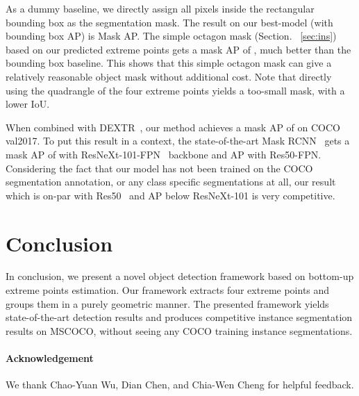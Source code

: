 \documentclass[10pt,twocolumn,letterpaper]{article}
\begin{document}
As a dummy baseline, we directly assign all pixels inside the rectangular bounding box as the segmentation mask. 
The result on our best-model (with  bounding box AP) is  Mask AP.
The simple octagon mask (Section. ~\ref{sec:ins}) based on our predicted extreme points gets a mask AP of , much better than the bounding box baseline.
This shows that this simple octagon mask can give a relatively reasonable object mask without additional cost.
Note that directly using the quadrangle of the four extreme points yields a too-small mask, with a lower IoU.

When combined with DEXTR~\cite{Man+18}, our method achieves a mask AP of  on COCO val2017. 
To put this result in a context, the state-of-the-art Mask RCNN~\cite{he2017mask} gets a mask AP of  with ResNeXt-101-FPN~\cite{lin2017feature,xie2017aggregated} backbone and  AP with Res50-FPN. 
Considering the fact that our model has not been trained on the COCO segmentation annotation, or any class specific segmentations at all, our result which is on-par with Res50~\cite{he2016deep} and  AP below ResNeXt-101 is very competitive. 

\section{Conclusion}
In conclusion, we present a novel object detection framework based on bottom-up extreme points estimation.
Our framework extracts four extreme points and groups them in a purely geometric manner.
The presented framework yields state-of-the-art detection results and produces competitive instance segmentation results on MSCOCO, without seeing any COCO training instance segmentations.

{
\paragraph{Acknowledgement}
We thank Chao-Yuan Wu, Dian Chen, and Chia-Wen Cheng for helpful feedback.
}


{\small


}
\end{document}
